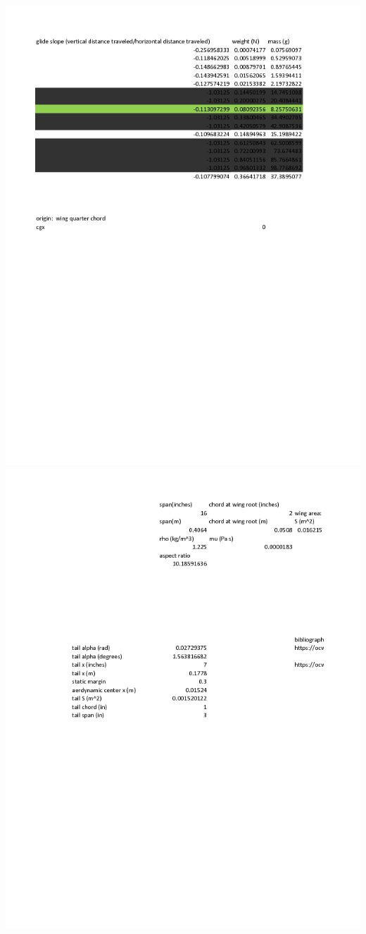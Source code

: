 \documentclass{article}
\begin{document}
\includegraphics[width = \textwidth]{glider_weight_calculation-1.png}
\includegraphics[width = \textwidth]{glider_weight_calculation-2.png}
\end{document}
